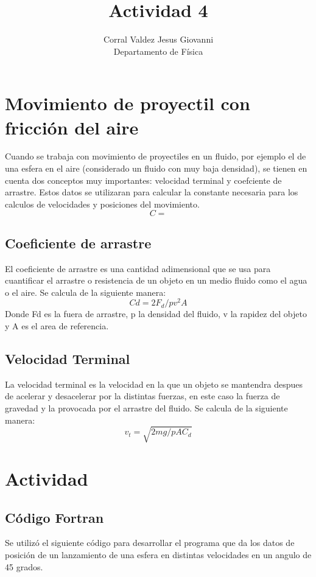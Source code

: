 \documentclass{article}
\title{Actividad 4}
\author{Corral Valdez Jesus Giovanni\\
Departamento de Física
}
\begin{document}
\maketitle
\section{Movimiento de proyectil con fricción del aire}
Cuando se trabaja con movimiento de proyectiles en un fluido, por ejemplo el de una esfera en el aire (considerado un fluido con muy baja densidad), se tienen en cuenta dos conceptos muy importantes: velocidad terminal y coefciente de arrastre. Estos datos se utilizaran para calcular la constante necesaria para los calculos de velocidades y posiciones del movimiento.
\begin{equation}
C=
\end{equation}


\subsection{Coeficiente de arrastre}
El coeficiente de arrastre es una cantidad adimensional que se usa para cuantificar el arrastre o resistencia de un objeto en un medio fluido como el agua o el aire.
Se calcula de la siguiente manera:
\begin{equation}
Cd = 2F_d/pv^2A
\end{equation}
Donde Fd es la fuera de arrastre, p la densidad del fluido, v la rapidez del objeto y A es el area de referencia.

\subsection{Velocidad Terminal}
La velocidad terminal es la velocidad en la que un objeto se mantendra despues de acelerar y desacelerar por la distintas fuerzas, en este caso la fuerza de gravedad y la provocada por el arrastre del fluido. Se calcula de la siguiente manera:
\begin{equation}
v_t=\sqrt{2mg/pAC_d}
\end{equation}

\section{Actividad}
\subsection{Código Fortran}
Se utilizó el siguiente código para desarrollar el programa que da los datos de posición de un lanzamiento de una esfera en distintas velocidades en un angulo de 45 grados.
\end{document}

